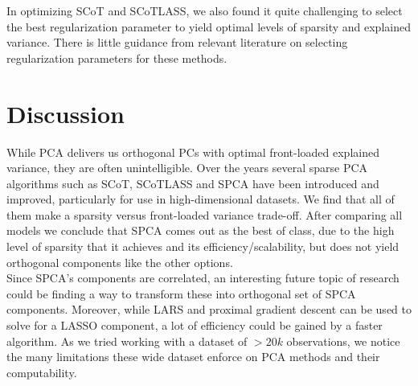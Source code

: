 \documentclass[11pt,letterpaper]{report}
\begin{document}
In optimizing SCoT and SCoTLASS, we also found it quite challenging to select the best regularization parameter to yield optimal levels of sparsity and explained variance. There is little guidance from relevant literature on selecting regularization parameters for these methods.


\section*{Discussion}
While PCA delivers us orthogonal PCs with optimal front-loaded explained variance, they are often unintelligible. Over the years several sparse PCA algorithms such as SCoT, SCoTLASS and SPCA have been introduced and improved, particularly for use in high-dimensional datasets. We find that all of them make a sparsity versus front-loaded variance trade-off. After comparing all models we conclude that SPCA comes out as the best of class, due to the high level of sparsity that it achieves and its efficiency/scalability, but does not yield orthogonal components like the other options.\\

Since SPCA's components are correlated, an interesting future topic of research could be finding a way to transform these into orthogonal set of SPCA components. Moreover, while LARS and proximal gradient descent can be used to solve for a LASSO component, a lot of efficiency could be gained by a faster algorithm. As we tried working with a dataset of $>20k$ observations, we notice the many limitations these wide dataset enforce on PCA methods and their computability.

%
%
\end{document}
